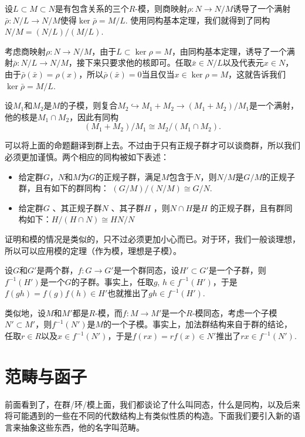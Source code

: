 \para 设$L\subset M \subset N$是有包含关系的三个$R$-模，则商映射$\rho:N\to N/M$诱导了一个满射$\bar{\rho}:N/L \to N/M$使得$\ker \bar{\rho}=M/L$. 使用同构基本定理，我们就得到了同构$N/M=(N/L)/(M/L)$.

考虑商映射$\rho:N\to N/M$，由于$L\subset \ker \rho=M$，由同构基本定理，诱导了一个满射$\bar{\rho}:N/L \to N/M$，接下来只要求他的核即可。任取$\bar{x}\in N/L$以及代表元$x\in N$，由于$\bar{\rho}(\bar{x})=\rho(x)$，所以$\bar{\rho} (\bar{x})=0$当且仅当$x\in \ker \rho =M$，这就告诉我们$\ker \bar{\rho}=M/L$.

\para \label{modiso1}设$M_1$和$M_2$是$M$的子模，则复合$M_2\hookrightarrow M_1+M_2 \to (M_1+M_2)/M_1$是一个满射，他的核是$M_1\cap M_2$，因此有同构
\[
	(M_1+M_2)/M_1\cong M_2/(M_1\cap M_2).
\]

\para 可以将上面的命题翻译到群上去。不过由于只有正规子群才可以谈商群，所以我们必须更加谨慎。两个相应的同构被如下表述：

\begin{itemize}
\item 给定群$G$，$N$和$M$为$G$的正规子群，满足$M$包含于$N$，则$N/M$是$G/M$的正规子群，且有如下的群同构： $ (G/M)/(N/M)\cong G/N$.

\item 给定群$G$ 、其正规子群$N$ 、其子群$H$ ，则$N\cap H$是$H$ 的正规子群，且有群同构如下：$H/(H\cap N)\cong HN/N$
\end{itemize}

证明和模的情况是类似的，只不过必须更加小心而已。对于环，我们一般谈理想，所以可以应用模的定理（作为模，理想是子模）。

\para 设$G$和$G'$是两个群，$f:G\to G'$是一个群同态，设$H'\subset G'$是一个子群，则$f^{-1}(H')$是一个$G$的子群。事实上，任取$g$, $h\in f^{-1}(H')$，于是$f(gh)=f(g)f(h)\in H'$也就推出了$gh\in f^{-1}(H')$. 

类似地，设$M$和$M'$都是$R$-模，而$f:M\to M'$是一个$R$-模同态，考虑一个子模$N'\subset M'$，则$f^{-1}(N')$是$M$的一个子模。事实上，加法群结构来自于群的结论，任取$r\in R$以及$x\in f^{-1}(N')$，于是$f(rx)=rf(x)\in N'$推出了$rx\in f^{-1}(N')$. 

\section{范畴与函子}

前面看到了，在群/环/模上面，我们都谈论了什么叫同态，什么是同构，以及后来将可能遇到的一些在不同的代数结构上有类似性质的构造。下面我们要引入新的语言来抽象这些东西，他的名字叫范畴。

